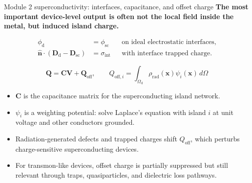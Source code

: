 \documentclass[aspectratio=169,10pt]{beamer}
\begin{document}
\begin{frame}{Module 2 superconductivity: interfaces, capacitance, and offset charge}
\footnotesize
\textbf{The most important device-level output is often not the local field inside the metal, but induced island charge.}

\vspace{-0.2em}
\begin{align*}
\phi_{\mathrm{d}}&=\phi_{\mathrm{sc}} &&\text{on ideal electrostatic interfaces},\\[-0.05em]
\hat{\mathbf n}\cdot(\mathbf D_{\mathrm{d}}-\mathbf D_{\mathrm{sc}})&=\sigma_{\mathrm{int}} &&\text{with interface trapped charge}.
\end{align*}

\vspace{-0.25em}
\begin{equation*}
\boxed{
\mathbf Q=\mathbf C\mathbf V+\mathbf Q_{\mathrm{off}},
\qquad
Q_{\mathrm{off},i}=\int_{\Omega_{\mathrm{d}}}\rho_{\mathrm{rad}}(\mathbf x)\psi_i(\mathbf x)\,d\Omega
}
\end{equation*}

\vspace{-0.2em}
\begin{itemize}
    \item $\mathbf C$ is the capacitance matrix for the superconducting island network.
    \item $\psi_i$ is a weighting potential: solve Laplace's equation with island $i$ at unit voltage and other conductors grounded.
    \item Radiation-generated defects and trapped charges shift $Q_{\mathrm{off}}$, which perturbs charge-sensitive superconducting devices.
    \item For transmon-like devices, offset charge is partially suppressed but still relevant through traps, quasiparticles, and dielectric loss pathways.
\end{itemize}
\end{frame}
\end{document}
